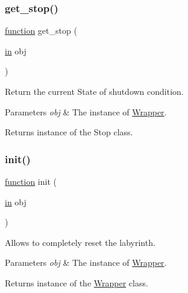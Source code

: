 \subsubsection{\texorpdfstring{get\+\_\+stop()}{get\_stop()}}
{\footnotesize\ttfamily \hyperlink{_plan__desuma_functions_8m_ac2ffb26d6f42d3bbcd7847b0873403f4}{function} get\+\_\+stop (\begin{DoxyParamCaption}\item[{\hyperlink{class_wrapper_a5e252d97ca5bf85c5753e2914673eead}{in}}]{obj }\end{DoxyParamCaption})}



Return the current State of shutdown condition. 


\begin{DoxyParams}{Parameters}
{\em obj} & The instance of \hyperlink{class_wrapper}{Wrapper}. \\
\hline
\end{DoxyParams}
\begin{DoxyReturn}{Returns}
instance of the Stop class. 
\end{DoxyReturn}
\mbox{\label{class_wrapper_a7d486dd79e7c7bc857ffaa4e273d27c5}} 
\subsubsection{\texorpdfstring{init()}{init()}}
{\footnotesize\ttfamily \hyperlink{_plan__desuma_functions_8m_ac2ffb26d6f42d3bbcd7847b0873403f4}{function} init (\begin{DoxyParamCaption}\item[{\hyperlink{class_wrapper_a5e252d97ca5bf85c5753e2914673eead}{in}}]{obj }\end{DoxyParamCaption})}



Allows to completely reset the labyrinth. 


\begin{DoxyParams}{Parameters}
{\em obj} & The instance of \hyperlink{class_wrapper}{Wrapper}. \\
\hline
\end{DoxyParams}
\begin{DoxyReturn}{Returns}
instance of the \hyperlink{class_wrapper}{Wrapper} class. 
\end{DoxyReturn}
\mbox{\label{class_wrapper_a9c889c73b9d4b80dde64dfe385ed747e}} 
